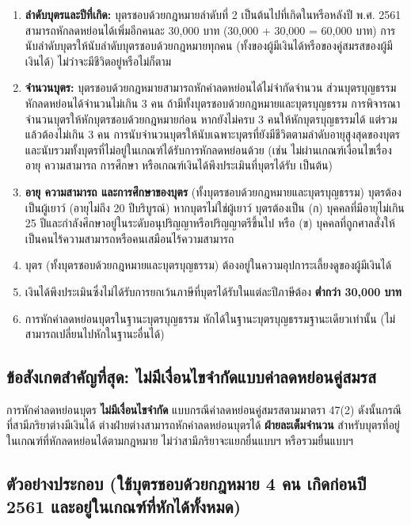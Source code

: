\documentclass[12pt,a4paper]{article}
\newcommand{\hilight}[1]{\textbf{#1}}
\begin{document}
\begin{enumerate}
    \item \textbf{ลำดับบุตรและปีที่เกิด:} บุตรชอบด้วยกฎหมายลำดับที่ 2 เป็นต้นไปที่เกิดในหรือหลังปี พ.ศ. 2561 สามารถหักลดหย่อนได้เพิ่มอีกคนละ 30,000 บาท (30,000 + 30,000 = 60,000 บาท) การนับลำดับบุตรให้นับลำดับบุตรชอบด้วยกฎหมายทุกคน (ทั้งของผู้มีเงินได้หรือของคู่สมรสของผู้มีเงินได้) ไม่ว่าจะมีชีวิตอยู่หรือไม่ก็ตาม
    \item \textbf{จำนวนบุตร:} บุตรชอบด้วยกฎหมายสามารถหักค่าลดหย่อนได้ไม่จำกัดจำนวน ส่วนบุตรบุญธรรมหักลดหย่อนได้จำนวนไม่เกิน 3 คน ถ้ามีทั้งบุตรชอบด้วยกฎหมายและบุตรบุญธรรม การพิจารณาจำนวนบุตรให้หักบุตรชอบด้วยกฎหมายก่อน หากยังไม่ครบ 3 คนให้หักบุตรบุญธรรมได้ แต่รวมแล้วต้องไม่เกิน 3 คน การนับจำนวนบุตรให้นับเฉพาะบุตรที่ยังมีชีวิตตามลำดับอายุสูงสุดของบุตร และนับรวมทั้งบุตรที่ไม่อยู่ในเกณฑ์ได้รับการหักลดหย่อนด้วย (เช่น ไม่ผ่านเกณฑ์เงื่อนไขเรื่องอายุ ความสามารถ การศึกษา หรือเกณฑ์เงินได้พึงประเมินที่บุตรได้รับ เป็นต้น)
    \item \textbf{อายุ ความสามารถ และการศึกษาของบุตร} (ทั้งบุตรชอบด้วยกฎหมายและบุตรบุญธรรม) บุตรต้องเป็นผู้เยาว์ (อายุไม่ถึง 20 ปีบริบูรณ์) หากบุตรไม่ใช่ผู้เยาว์ บุตรต้องเป็น (ก) บุคคลที่มีอายุไม่เกิน 25 ปีและกำลังศึกษาอยู่ในระดับอนุปริญญาหรือปริญญาตรีขึ้นไป หรือ (ข) บุคคลที่ถูกศาลสั่งให้เป็นคนไร้ความสามารถหรือคนเสมือนไร้ความสามารถ
    \item บุตร (ทั้งบุตรชอบด้วยกฎหมายและบุตรบุญธรรม) ต้องอยู่ในความอุปการะเลี้ยงดูของผู้มีเงินได้
    \item เงินได้พึงประเมินซึ่งไม่ได้รับการยกเว้นภาษีที่บุตรได้รับในแต่ละปีภาษีต้อง \hilight{ต่ำกว่า 30,000 บาท}
    \item การหักค่าลดหย่อนบุตรในฐานะบุตรบุญธรรม หักได้ในฐานะบุตรบุญธรรมฐานะเดียวเท่านั้น (ไม่สามารถเปลี่ยนไปหักในฐานะอื่นได้)
\end{enumerate}

\subsection*{ข้อสังเกตสำคัญที่สุด: ไม่มีเงื่อนไขจำกัดแบบค่าลดหย่อนคู่สมรส}

การหักค่าลดหย่อนบุตร \hilight{ไม่มีเงื่อนไขจำกัด} แบบกรณีค่าลดหย่อนคู่สมรสตามมาตรา 47(2) ดังนั้นกรณีที่สามีภริยาต่างมีเงินได้ ต่างฝ่ายต่างสามารถหักค่าลดหย่อนบุตรได้ \hilight{ฝ่ายละเต็มจำนวน} สำหรับบุตรที่อยู่ในเกณฑ์ที่หักลดหย่อนได้ตามกฎหมาย ไม่ว่าสามีภริยาจะแยกยื่นแบบฯ หรือรวมยื่นแบบฯ

\subsection*{ตัวอย่างประกอบ (ใช้บุตรชอบด้วยกฎหมาย 4 คน เกิดก่อนปี 2561 และอยู่ในเกณฑ์ที่หักได้ทั้งหมด)}
\end{document}
